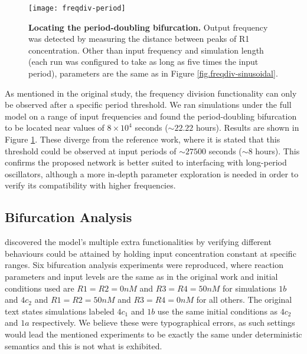     \begin{figure}[!htb]
      \centering
      \texttt{[image: freqdiv-period]}
      \caption{\textbf{Locating the period-doubling bifurcation.} Output frequency was detected by measuring the distance between peaks of R1 concentration. Other than input frequency and simulation length (each run was configured to take as long as five times the input period), parameters are the same as in Figure \ref{fig.freqdiv-sinusoidal}.}
      \label{fig.freqdiv-period}
    \end{figure}

    As mentioned in the original study, the frequency division functionality can only be observed after a specific period threshold.
    We ran simulations under the full model on a range of input frequencies and found the period-doubling bifurcation to be located near values of $8 \times 10^4$ seconds ($\sim 22.22$ hours).
    Results are shown in Figure \ref{fig.freqdiv-period}.
    These diverge from the reference work, where it is stated that this threshold could be observed at input periods of $\sim 27500$ seconds ($\sim 8$ hours).
    This confirms the proposed network is better suited to interfacing with long-period oscillators, although a more in-depth parameter exploration is needed in order to verify its compatibility with higher frequencies.


  \subsection{Bifurcation Analysis}

    \citet{originals} discovered the model's multiple extra functionalities by verifying different behaviours could be attained by holding input concentration constant at specific ranges.
    Six bifurcation analysis experiments were reproduced, where reaction parameters and input levels are the same as in the original work and initial conditions used are $R1=R2=0nM$ and $R3=R4=50nM$ for simulations $1b$ and $4c_{2}$ and $R1=R2=50nM$ and $R3=R4=0nM$ for all others.
    The original text states simulations labeled $4c_{1}$ and $1b$ use the same initial conditions as $4c_{2}$ and $1a$ respectively.
    We believe these were typographical errors, as such settings would lead the mentioned experiments to be exactly the same under deterministic semantics and this is not what is exhibited.

